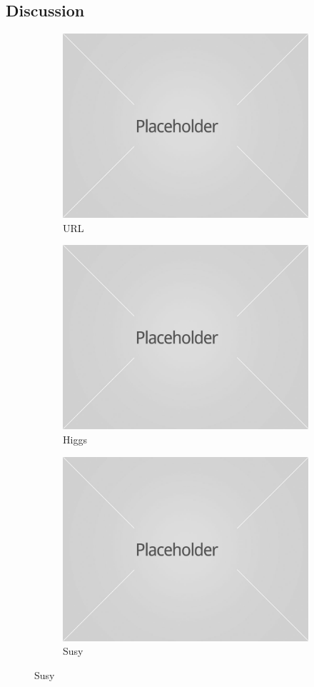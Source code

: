 \documentclass{vldb}
\begin{document}
\subsection{Discussion}
\begin{figure}[h]
\begin{subfigure}{0.33\textwidth}
  \centering
  \includegraphics[width=0.7\linewidth]{../images/experiment-results/placeholder.jpg}
  \caption{URL}
  \label{fig:sfig2}
\end{subfigure}%
\begin{subfigure}{0.33\textwidth}
 \centering
  \includegraphics[width=0.7\linewidth]{../images/experiment-results/placeholder.jpg}
  \caption{Higgs}
\end{subfigure}%
\begin{subfigure}{0.33\textwidth}
 \centering
  \includegraphics[width=0.7\linewidth]{../images/experiment-results/placeholder.jpg}
  \caption{Susy}
\end{subfigure}


\end{figure}
\end{document}
